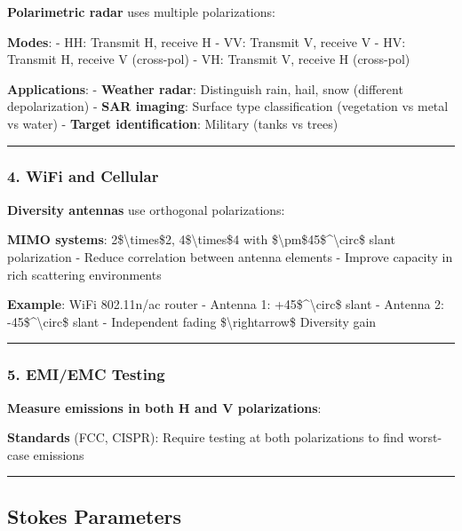 \textbf{Polarimetric radar} uses multiple polarizations:

\textbf{Modes}: - HH: Transmit H, receive H - VV: Transmit V, receive V
- HV: Transmit H, receive V (cross-pol) - VH: Transmit V, receive H
(cross-pol)

\textbf{Applications}: - \textbf{Weather radar}: Distinguish rain, hail,
snow (different depolarization) - \textbf{SAR imaging}: Surface type
classification (vegetation vs metal vs water) - \textbf{Target
identification}: Military (tanks vs trees)

\begin{center}\rule{0.5\linewidth}{0.5pt}\end{center}

\subsubsection{4. WiFi and Cellular}\label{wifi-and-cellular}

\textbf{Diversity antennas} use orthogonal polarizations:

\textbf{MIMO systems}: 2\$\textbackslash times\$2,
4\$\textbackslash times\$4 with
\$\textbackslash pm\$45\$\^{}\textbackslash circ\$ slant polarization -
Reduce correlation between antenna elements - Improve capacity in rich
scattering environments

\textbf{Example}: WiFi 802.11n/ac router - Antenna 1:
+45\$\^{}\textbackslash circ\$ slant - Antenna 2:
-45\$\^{}\textbackslash circ\$ slant - Independent fading
\$\textbackslash rightarrow\$ Diversity gain

\begin{center}\rule{0.5\linewidth}{0.5pt}\end{center}

\subsubsection{5. EMI/EMC Testing}\label{emiemc-testing}

\textbf{Measure emissions in both H and V polarizations}:

\textbf{Standards} (FCC, CISPR): Require testing at both polarizations
to find worst-case emissions

\begin{center}\rule{0.5\linewidth}{0.5pt}\end{center}

\subsection{Stokes Parameters}\label{stokes-parameters}

